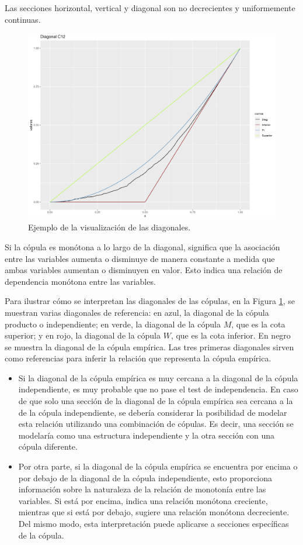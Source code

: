 \begin{corl}
    Las secciones horizontal, vertical y diagonal son no decrecientes y uniformemente continuas.
\end{corl}

\begin{figure}[H]
    \centering
    \includegraphics[width =  0.6 \textwidth]{4img/DiagMujC12.png}
    \caption{Ejemplo de la visualización de las diagonales.}
    \label{fig:diagEj}
\end{figure}

Si la cópula es monótona a lo largo de la diagonal, significa que la asociación entre las variables aumenta o disminuye de manera constante a medida que ambas variables aumentan o disminuyen en valor. Esto indica una relación de dependencia monótona entre las variables. \cite{TesisEmanuel}

Para ilustrar cómo se interpretan las diagonales de las cópulas, en la Figura \ref{fig:diagEj}, se muestran varias diagonales de referencia: en azul, la diagonal de la cópula producto o independiente; en verde, la diagonal de la cópula $M$, que es la cota superior; y en rojo, la diagonal de la cópula $W$, que es la cota inferior. En negro se muestra la diagonal de la cópula empírica. Las tres primeras diagonales sirven como referencias para inferir la relación que representa la cópula empírica.

\begin{itemize}
    \item Si la diagonal de la cópula empírica es muy cercana a la diagonal de la cópula independiente, es muy probable que no pase el test de independencia. En caso de que solo una sección de la diagonal de la cópula empírica sea cercana a la de la cópula independiente, se debería considerar la posibilidad de modelar esta relación utilizando una combinación de cópulas. Es decir, una sección se modelaría como una estructura independiente y la otra sección con una cópula diferente.

    \item Por otra parte, si la diagonal de la cópula empírica se encuentra por encima o por debajo de la diagonal de la cópula independiente, esto proporciona información sobre la naturaleza de la relación de monotonía entre las variables. Si está por encima, indica una relación monótona creciente, mientras que si está por debajo, sugiere una relación monótona decreciente. Del mismo modo, esta interpretación puede aplicarse a secciones específicas de la cópula.
\end{itemize}

